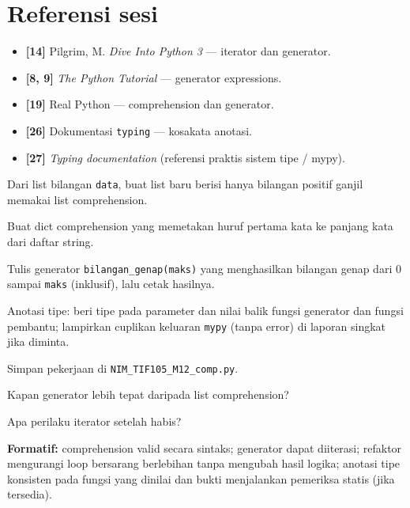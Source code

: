 \documentclass[../main.tex]{subfiles}
\begin{document}
\section{Referensi sesi}

\begin{itemize}[leftmargin=*]
  \item \textbf{[14]} Pilgrim, M. \textit{Dive Into Python 3} --- iterator dan generator.
  \item \textbf{[8, 9]} \textit{The Python Tutorial} --- generator expressions.
  \item \textbf{[19]} Real Python --- comprehension dan generator.
  \item \textbf{[26]} Dokumentasi \texttt{typing} --- kosakata anotasi.
  \item \textbf{[27]} \textit{Typing documentation} (referensi praktis sistem tipe / mypy).
\end{itemize}

\begin{aktivitas}
  \item Dari list bilangan \texttt{data}, buat list baru berisi hanya bilangan positif ganjil memakai list comprehension.
  \item Buat dict comprehension yang memetakan huruf pertama kata ke panjang kata dari daftar string.
  \item Tulis generator \texttt{bilangan\_genap(maks)} yang menghasilkan bilangan genap dari 0 sampai \texttt{maks} (inklusif), lalu cetak hasilnya.
  \item Anotasi tipe: beri tipe pada parameter dan nilai balik fungsi generator dan fungsi pembantu; lampirkan cuplikan keluaran \texttt{mypy} (tanpa error) di laporan singkat jika diminta.
  \item Simpan pekerjaan di \texttt{NIM\_TIF105\_M12\_comp.py}.
\end{aktivitas}

\begin{latihan}
  \item Kapan generator lebih tepat daripada list comprehension?
  \item Apa perilaku iterator setelah habis?
\end{latihan}

\begin{asesmen}
\textbf{Formatif:} comprehension valid secara sintaks; generator dapat diiterasi; refaktor mengurangi loop bersarang berlebihan tanpa mengubah hasil logika; anotasi tipe konsisten pada fungsi yang dinilai dan bukti menjalankan pemeriksa statis (jika tersedia).
\end{asesmen}
\end{document}
